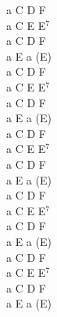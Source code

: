 \documentclass[a5paper, 10pt]{book}
\begin{document}
\begin{minipage}[t]{0.2\textwidth}
a C D F\\
a C E E$^7$\\
a C D F\\
a E a (E)\\

a C D F\\
a C E E$^7$\\
a C D F\\
a E a (E)\\

a C D F\\
a C E E$^7$\\
a C D F\\
a E a (E)\\

a C D F\\
a C E E$^7$\\
a C D F\\
a E a (E)\\

a C D F\\
a C E E$^7$\\
a C D F\\
a E a (E)\\
\end{minipage}

\newpage
\end{document}
